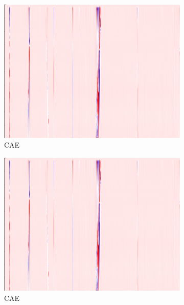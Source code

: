 \begin{figure}[!h]
    \begin{subfigure}{0.33\textwidth}
        \includegraphics[width=\textwidth]{figures/test.png}
        \caption{CAE}
    \end{subfigure}%
    \hfill
    \begin{subfigure}{0.33\textwidth}
        \includegraphics[width=\textwidth]{figures/test.png}
        \caption{CAE}
    \end{subfigure}%
    \hfill
    \begin{subfigure}{0.33\textwidth}

\end{subfigure}
\end{figure}
